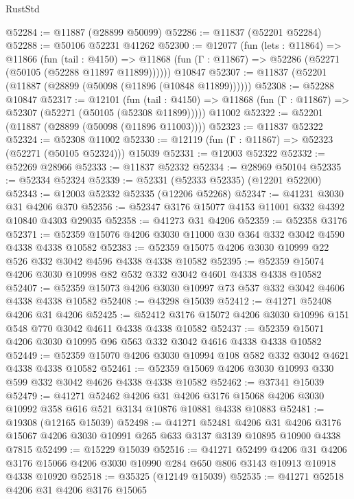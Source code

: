 \begin{lexlean}{RustStd}
\begin{coremodule}
{\begin{coremodule}
{{{{{{{{{{{{{{{{{{{{{{{{{{{{{{{{{{{{{{{{{{{{{{{{{{@52284 := @11887 (@28899 @50099)
@52286 := @11837 (@52201 @52284)
@52288 := @50106 @52231 @41262
@52300 := @12077
    (fun (lets : @11864) =>
    @11866
      (fun (tail : @4150) =>
      @11868 (fun (Γ : @11867) => @52286 (@52271 (@50105 (@52288 @11897 @11899))))))
    @10847
@52307 := @11837 (@52201 (@11887 (@28899 (@50098 (@11896 (@10848 @11899))))))
@52308 := @52288 @10847
@52317 := @12101
    (fun (tail : @4150) => @11868 (fun (Γ : @11867) => @52307 (@52271 (@50105 (@52308 @11899)))))
    @11002
@52322 := @52201 (@11887 (@28899 (@50098 (@11896 @11003))))
@52323 := @11837 @52322
@52324 := @52308 @11002
@52330 := @12119 (fun (Γ : @11867) => @52323 (@52271 (@50105 @52324))) @15039
@52331 := @12003 @52322
@52332 := @52269 @28966
@52333 := @11837 @52332
@52334 := @28969 @50104
@52335 := @52334 @52324
@52339 := @52331 (@52333 @52335) (@12201 @52200)
@52343 := @12003 @52332 @52335 (@12206 @52268)
@52347 := @41231 @3030 @31 @4206 @370
@52356 := @52347 @3176 @15077 @4153 @11001 @332 @4392 @10840 @4303 @29035
@52358 := @41273 @31 @4206
@52359 := @52358 @3176
@52371 := @52359 @15076 @4206 @3030 @11000 @30 @364 @332 @3042 @4590 @4338 @4338 @10582
@52383 := @52359 @15075 @4206 @3030 @10999 @22 @526 @332 @3042 @4596 @4338 @4338 @10582
@52395 := @52359 @15074 @4206 @3030 @10998 @82 @532 @332 @3042 @4601 @4338 @4338 @10582
@52407 := @52359 @15073 @4206 @3030 @10997 @73 @537 @332 @3042 @4606 @4338 @4338 @10582
@52408 := @43298 @15039
@52412 := @41271 @52408 @4206 @31 @4206
@52425 := @52412 @3176 @15072 @4206 @3030 @10996 @151 @548 @770 @3042 @4611 @4338 @4338 @10582
@52437 := @52359 @15071 @4206 @3030 @10995 @96 @563 @332 @3042 @4616 @4338 @4338 @10582
@52449 := @52359 @15070 @4206 @3030 @10994 @108 @582 @332 @3042 @4621 @4338 @4338 @10582
@52461 := @52359 @15069 @4206 @3030 @10993 @330 @599 @332 @3042 @4626 @4338 @4338 @10582
@52462 := @37341 @15039
@52479 := @41271
    @52462
    @4206
    @31
    @4206
    @3176
    @15068
    @4206
    @3030
    @10992
    @358
    @616
    @521
    @3134
    @10876
    @10881
    @4338
    @10883
@52481 := @19308 (@12165 @15039)
@52498 := @41271
    @52481
    @4206
    @31
    @4206
    @3176
    @15067
    @4206
    @3030
    @10991
    @265
    @633
    @3137
    @3139
    @10895
    @10900
    @4338
    @7815
@52499 := @15229 @15039
@52516 := @41271
    @52499
    @4206
    @31
    @4206
    @3176
    @15066
    @4206
    @3030
    @10990
    @284
    @650
    @806
    @3143
    @10913
    @10918
    @4338
    @10920
@52518 := @35325 (@12149 @15039)
@52535 := @41271
    @52518
    @4206
    @31
    @4206
    @3176
    @15065
}}}}}}}}}}}}}}}}}}}}}}}}}}}}}}}}}}}}}}}}}}}}}}}}}}
\end{coremodule}}
\end{coremodule}
\end{lexlean}
